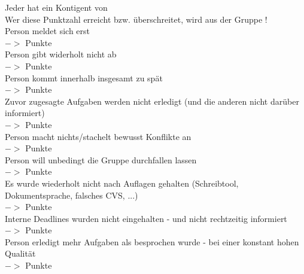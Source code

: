 \documentclass[fontsize=12pt,paper=a4,twoside]{scrartcl}
\begin{document}
\small Jeder hat ein Kontigent von \color{red}{11 Punkten}\color{black}\\[0.7em]
\small Wer diese Punktzahl erreicht bzw. überschreitet, wird aus der Gruppe \color{red}{ausgeschlossen}\color{black}!\\[0.7em]

\small Person meldet sich erst \color{blue}{nach 2 Tagen ohne Begründung}\color{black}\\
\small $->$ \color{red}{3,5 }\color{black} Punkte\\

\small Person gibt widerholt nicht ab\\
\small $->$ \color{red}{5,5 }\color{black} Punkte\\

\small Person kommt innerhalb \color{blue}{eines Monats }\color{black} insgesamt \color{blue}{30min }\color{black} zu spät\\
\small $->$ \color{red}{2,0 }\color{black} Punkte\\

\small Zuvor zugesagte Aufgaben werden nicht erledigt (und die anderen nicht darüber informiert)\\
\small $->$ \color{red}{1,5 }\color{black} Punkte\\

\small Person macht nichts/stachelt bewusst Konflikte an\\
\small $->$ \color{red}{8,0 }\color{black} Punkte\\

\small Person will unbedingt  die Gruppe durchfallen lassen\\
\small $->$ \color{red}{11,0 }\color{black} Punkte\\

\small Es wurde wiederholt nicht nach Auflagen gehalten (Schreibtool, Dokumentsprache, falsches CVS, ...)\\
\small $->$ \color{red}{jeweils 1,0 }\color{black} Punkte\\

\small Interne Deadlines wurden nicht eingehalten - und nicht rechtzeitig informiert\\
\small $->$ \color{red}{0,5 - 2,5 (je nach Häufigkeit) }\color{black} Punkte\\

\small \color{gray} Person erledigt mehr Aufgaben als besprochen wurde - bei einer konstant hohen Qualität\color{black}\\
\small $->$ \color{green}{-3,5 }\color{black} Punkte\\
\end{document}
